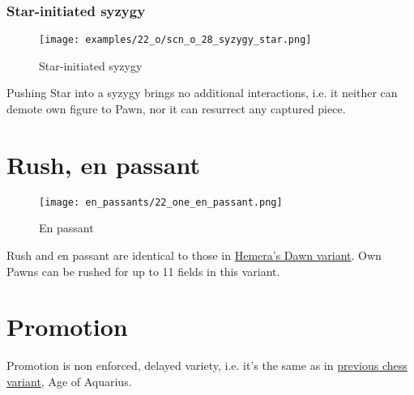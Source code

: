 \clearpage %

\subsubsection*{Star-initiated syzygy}

\vspace*{-1.2\baselineskip}
\noindent
\begin{figure}[!h]
\texttt{[image: examples/22\_o/scn\_o\_28\_syzygy\_star.png]}
\caption{Star-initiated syzygy}
\label{fig:scn_o_28_syzygy_star}
\end{figure}

Pushing Star into a syzygy brings no additional interactions, i.e. it neither can
demote own figure to Pawn, nor it can resurrect any captured piece.

\clearpage %

\section*{Rush, en passant}

\vspace*{-1.2\baselineskip}
\noindent
\begin{figure}[!h]
\texttt{[image: en\_passants/22\_one\_en\_passant.png]}
\caption{En passant}
\label{fig:22_one_en_passant}
\end{figure}

Rush and en passant are identical to those in \hyperref[fig:14_hemera_s_dawn_en_passant]{Hemera's Dawn variant}.
Own Pawns can be rushed for up to 11 fields in this variant.

\clearpage %

\section*{Promotion}
\label{sec:One/Promotion}

Promotion is non enforced, delayed variety, i.e. it's the same as in
\hyperref[sec:Age of Aquarius/Promotion]{previous chess variant}, Age of Aquarius.


